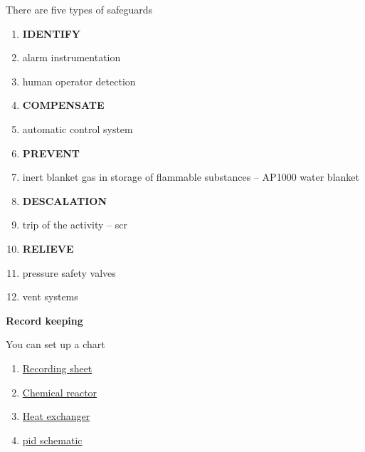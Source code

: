 \documentclass[aspectratio=1610,pdftex,dvipsnames,compress,xcolor={dvipsnames}]{beamer}
\newcommand{\acs}{\acrshort} %
\begin{document}
\addtocounter{framenumber}{-1}
\begin{frame}{There are five types of safeguards}
    \begin{enumerate}[series=outerlist,topsep=0pt,itemsep=1pt,leftmargin=*,label=(\arabic*)]
        \item[]\textbf{IDENTIFY}
        \item[]alarm instrumentation  
        \item[]human operator detection  
            \vspace{0.07in}
        \item[]\textbf{COMPENSATE}
        \item[]automatic control system
            \vspace{0.07in}
        \item[]\textbf{PREVENT}
        \item[]inert blanket gas in storage of flammable substances -- AP1000 water blanket
            \vspace{0.07in}
        \item[]\textbf{DESCALATION}
        \item[]trip of the activity -- \acs{scr}
            \vspace{0.07in}
        \item[]\textbf{RELIEVE}
        \item[]pressure safety valves
        \item[]vent systems
    \end{enumerate}
\end{frame}


\begin{frame}[plain]{}
    \centering\LARGE\textbf{Record keeping}
\end{frame}


\addtocounter{framenumber}{-1}
\begin{frame}{You can set up a chart}
    \begin{enumerate}[series=outerlist,topsep=0pt,itemsep=21pt,leftmargin=*,label=(\arabic*)]
        \item[]\href{https://red-bag.com/imageslib/BN-EG-UE105_02.pdf}{Recording sheet}
        \item[]\href{http://www.ehsdb.com/resources/Imges-3/Images-3/hazop-15.JPG?timestamp=1436341480548}{Chemical reactor}
        \item[]\href{http://www.ehsdb.com/resources/Imges-3/Images-3/hazop-18.JPG?timestamp=1436342662934}{Heat exchanger}
        \item[]\href{http://group10integratedprojectmay15.weebly.com/hazop-and-pid.html}{\acs{pid} schematic}
    \end{enumerate}
\end{frame}
\end{document}
